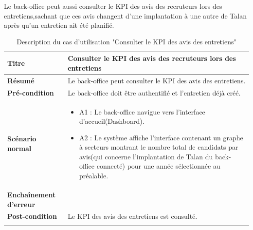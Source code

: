 Le back-office peut aussi consulter le KPI des avis des recruteurs lors des entretiens,sachant que ces avis changent d'une implantation à une autre de Talan après qu'un entretien ait été planifié.
\begin{longtable}[c]{
    |p{}|
    |p{}|
}
    \hline
    \textbf{Titre}
    &   Consulter le KPI des avis des recruteurs lors des entretiens\\
    \hline
    \textbf{Résumé}
    & Le back-office peut consulter le KPI des avis des entretiens. \\
    \hline
     \textbf{Pré-condition}
    & Le back-office doit être authentifié et l'entretien déjà créé.\\
    \hline
     \textbf{Scénario normal}
    & \begin{itemize}
        \item A1 : Le back-office navigue vers l'interface d'accueil(Dashboard). 
        \item A2 : Le système affiche l'interface contenant un graphe à secteurs montrant le nombre total de candidats par avis(qui concerne l'implantation de Talan du back-office connecté) pour une année sélectionnée au préalable.
    \end{itemize}\\
    \hline
    \textbf{Enchaînement d'erreur}
    & \\
    \hline
    \textbf{Post-condition}
    & Le KPI des avis des entretiens est consulté.\\
    \hline
\caption{Description du cas d'utilisation "Consulter le KPI des avis des entretiens"}
\label{tab:desc_consult_KPI}
\end{longtable} 

